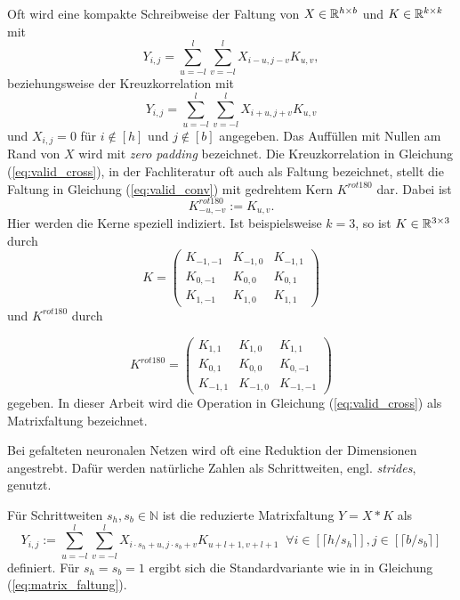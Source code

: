 \begin{bem}
    \label{bem:K_conv_komp}
    Oft wird eine kompakte Schreibweise der Faltung von $X \in \mathbb{R}^{h \times b}$ und $ K \in \mathbb{R}^{k \times k}$ mit 
    \begin{equation}
        \label{eq:valid_conv}
        Y_{i,j}=\sum_{u=-l}^l \sum_{v=-l}^l X_{i-u,j-v}K_{u,v},
    \end{equation} beziehungsweise der Kreuzkorrelation mit
    \begin{equation}
        \label{eq:valid_cross}
        Y_{i,j}=\sum_{u=-l}^l \sum_{v=-l}^l X_{i+u,j+v}K_{u,v}
    \end{equation}
    und $X_{i,j}=0$ für $i \notin [h]$ und $j \notin [b]$ angegeben. Das Auffüllen mit Nullen am Rand von $X$ wird mit \textit{zero padding} bezeichnet. Die Kreuzkorrelation in Gleichung (\ref{eq:valid_cross}), in der Fachliteratur oft auch als Faltung bezeichnet, stellt die Faltung in Gleichung (\ref{eq:valid_conv}) mit gedrehtem Kern $K^{rot180}$ dar. Dabei ist 
    \begin{equation*}
        K^{rot180}_{-u,-v}:=K_{u,v}.
    \end{equation*}
    Hier werden die Kerne speziell indiziert. Ist beispielsweise $k=3$, so ist $K \in \mathbb{R}^{3 \times 3}$ durch
    \begin{equation*}
        K=\begin{pmatrix}
            K_{-1,-1} &K_{-1,0} &K_{-1,1} \\
            K_{0,-1} &K_{0,0} &K_{0,1}  \\
            K_{1,-1} &K_{1,0} &K_{1,1} 
        \end{pmatrix}
    \end{equation*} und $K^{rot180}$ durch

    \begin{equation*}
        K^{rot180}=\begin{pmatrix}
            K_{1,1} &K_{1,0} &K_{1,1} \\
            K_{0,1} &K_{0,0} &K_{0,-1}  \\
            K_{-1,1} &K_{-1,0} &K_{-1,-1} 
        \end{pmatrix}
    \end{equation*}
    gegeben. In dieser Arbeit wird die Operation in Gleichung (\ref{eq:valid_cross}) als Matrixfaltung bezeichnet.
\end{bem}

Bei gefalteten neuronalen Netzen wird oft eine Reduktion der Dimensionen angestrebt. Dafür werden natürliche Zahlen als Schrittweiten, engl. \textit{strides}, genutzt.
\begin{bem}\label{bem_strides}
    Für Schrittweiten $s_h, s_b \in \mathbb{N}$ ist die reduzierte Matrixfaltung $Y=X \ast K$ als
    \begin{equation*}
        Y_{i,j}:=\sum_{u=-l}^{l} \sum_{v=-l}^{l} X_{i \cdot s_h +u,j \cdot s_b +v} K_{u+l+1, v+l+1}\; \; \forall i \in [\lceil h/s_h \rceil], j \in [\lceil b/s_b \rceil]
    \end{equation*}
    definiert.
    Für $s_h=s_b=1$ ergibt sich die Standardvariante wie in in Gleichung (\ref{eq:matrix_faltung}).
    \end{bem}

